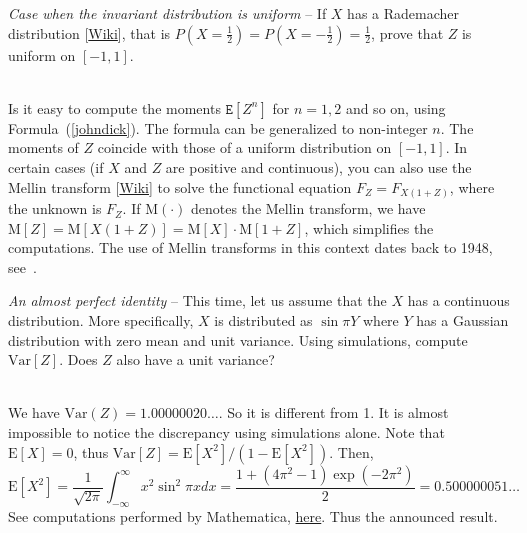 \documentclass[oneside,10pt]{book}
\begin{document}
\begin{Exercise}\label{paasweqasde} {\em Case when the invariant distribution is uniform} -- If
 $X$ has a \textcolor{index}{Rademacher distribution} [\href{https://en.wikipedia.org/wiki/Rademacher_distribution}{Wiki}], that is $P(X=\frac{1}{2}) =
 P(X=-\frac{1}{2}) =\frac{1}{2}$, prove that $Z$ is uniform on $[-1, 1]$.
\vspace{1ex}

 \\
Is it easy to compute the moments $\texttt{E}[Z^n]$ for $n=1,2$ and so on, using
Formula~(\ref{johndick}). The formula can be generalized to non-integer $n$. The moments of $Z$ coincide with those of a uniform distribution on $[-1, 1]$.
In certain cases (if $X$ and $Z$ are positive and continuous),
you can also use the \textcolor{index}{Mellin transform} [\href{https://en.wikipedia.org/wiki/Mellin_transform}{Wiki}]
to solve the functional equation $F_Z = F_{X(1+Z)}$, where the unknown is $F_Z$.
If $\text{M}(\cdot)$ denotes the Mellin transform, we have $\text{M}[Z] =\text{M}[X(1+Z)] = \text{M}[X]\cdot \text{M}[1+Z]$, which simplifies
 the computations. The use of Mellin transforms in this context dates back to 1948, see~\cite{mellin48}.
\end{Exercise}

\begin{Exercise}\label{p} {\em An almost perfect identity} -- This time, let us assume that the $X$ has a continuous distribution.
More specifically,  $X$ is distributed as $\sin\pi Y$ where $Y$ has a Gaussian distribution with zero mean and unit variance.
Using simulations, compute $\text{Var}[Z]$. Does $Z$ also have a unit variance?
\vspace{1ex}

 \\
We have $\text{Var}(Z) = 1.00000020\dots$. So it is different from 1. It is almost impossible to notice the discrepancy
 using simulations alone. Note that $\text{E}[X] = 0$, thus $\text{Var}[Z] = \text{E}[X^2] / (1 - \text{E}[X^2])$.  Then,
$$
\text{E}[X^2] =\frac{1}{\sqrt{2\pi}}\int_{-\infty}^\infty x^2 \sin^2 \pi x dx
 = \frac{1+(4\pi^2 - 1)\exp(-2\pi^2)}{2}
= 0.500000051\dots
$$
See computations performed by Mathematica, \href{https://mltblog.com/3JqDagR}{here}. Thus the announced result.
\end{Exercise}
\end{document}
